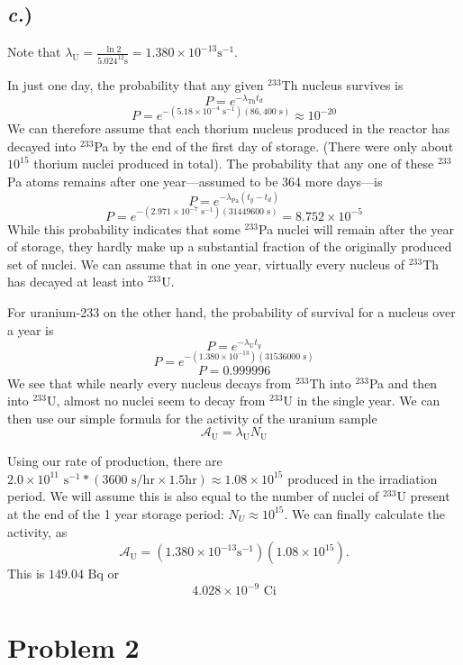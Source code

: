 \documentclass{report}
\begin{document}
\subsection*{\textit{c.})}
Note that $\lambda_{\text{U}} = \frac{\ln 2}{5.024^{12}\text{s}} = 1.380\times10^{-13}\text{s}^{-1}$. 

In just one day, the probability that any given $^{233}$Th nucleus survives is
$$ P = e^{-\lambda_{\text{Th}}t_d} $$
$$ P = e^{-(5.18\times10^{-4}\text{ s}^{-1})(86,400\text{ s})} \approx 10^{-20} $$
We can therefore assume that each thorium nucleus produced in the reactor has decayed into $^{233}$Pa by the end of the first day of storage. (There were only about $10^{15}$ thorium nuclei produced in total).
The probability that any one of these $^{233}$Pa atoms remains after one year---assumed to be 364 more days---is
$$ P = e^{-\lambda_{\text{Pa}}(t_y-t_d)} $$
$$ P = e^{-(2.971\times10^{-7}\text{ s}^{-1})(31449600\text{ s})} = 8.752\times10^{-5}  $$
While this probability indicates that some $^{233}$Pa nuclei will remain after the year of storage, they hardly make up a substantial fraction of the originally produced set of nuclei. We can assume that in one year, virtually every nucleus of $^{233}$Th has decayed at least into $^{233}$U.  

For uranium-233 on the other hand, the probability of survival for a nucleus over a year is
$$ P = e^{-\lambda_{\text{U}}t_y} $$
$$ P = e^{-(1.380\times10^{-13})(31536000\text{ s})} $$
$$ P = 0.999996 $$
We see that while nearly every nucleus decays from $^{233}$Th into $^{233}$Pa and then into $^{233}$U, almost no nuclei seem to decay from $^{233}$U in the single year.
We can then use our simple formula for the activity of the uranium sample
$$ \mathcal{A}_{\text{U}} = \lambda_{\text{U}} N_{\text{U}}$$

Using our rate of production, there are $2.0\times10^{11}\text{ s}^{-1}*(3600\text{ s/hr}\times 1.5 \text{hr}) \approx 1.08\times10^{15}$ produced in the irradiation period. We will assume this is also equal to the number of nuclei of $^{233}$U present at the end of the 1 year storage period: $N_U \approx 10^{15}$. We can finally calculate the activity, as 
$$ \mathcal{A}_{\text{U}} = (1.380\times10^{-13}\text{s}^{-1})(1.08\times10^{15}) .$$
This is ${149.04}\text{ Bq}$ or 
$$\boxed{ 4.028\times10^{-9}\text{ Ci} }$$

\newpage
\section*{Problem 2}
\end{document}
